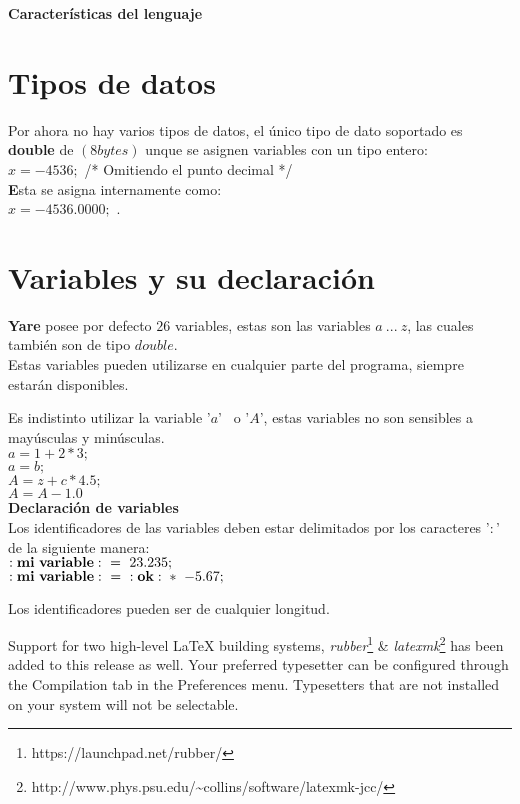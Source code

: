 \documentclass[11pt]{article}
\begin{document}
\newpage
\begin{center}{\bf \LARGE Caracter\'isticas del lenguaje}\end{center}
\section{Tipos de datos}

Por ahora no hay varios tipos de datos, el \'unico tipo de dato soportado es {\bf double} de $(8 bytes )$
unque se asignen variables con un tipo entero:\\
$x = -4536;$ /* Omitiendo el punto decimal */ \\
{\bf E}sta se asigna internamente como:\\
$x = -4536{.}0000;$ .\\

\section{Variables y su declaraci\'on}

{\bf Yare} posee por defecto $26$ variables, estas son las variables $a\ ...\ z$, las cuales tambi\'en son de tipo $double$.\\
Estas variables pueden utilizarse en cualquier parte del programa, siempre estar\'an disponibles.

Es indistinto utilizar la variable '$a$' \ o '$A$', estas variables no son sensibles a may\'usculas y min\'usculas.\\

$a = 1 + 2 * 3;$\\
$a = b;$\\
$A = z + c * 4.5;$\\
$A = A - 1.0$\\

{\bf Declaraci\'on de variables}\\

Los identificadores de las variables deben estar delimitados por los caracteres '$:$' de la siguiente manera:\\

${\bf :mi\ variable:\ } =\ 23.235;$\\
${\bf :mi\ variable:\ } =\ {\bf:ok:}\ *\ -5.67;$

Los identificadores pueden ser de cualquier longitud.

Support for two high-level {\LaTeX} building systems, \emph{rubber}\footnote{https://launchpad.net/rubber/} \& \emph{latexmk}\footnote{http://www.phys.psu.edu/{\textasciitilde}collins/software/latexmk-jcc/} has been added to this release as well. Your preferred typesetter can be configured through the Compilation tab in the Preferences menu. Typesetters that are not installed on your system will not be selectable. 
\end{document}
